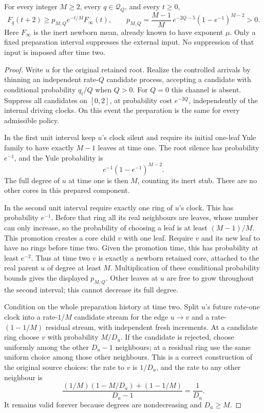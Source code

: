 \begin{lemma}
\label{bcl:preparation}
For every integer $M\ge2$, every $q\in\mathcal Q_Q$, and every $t\ge0$,
\begin{equation}\label{bcl:uniform-lower}
 \boxed{
 F_q(t+2)\ge p_{M,Q}e^{-t/M}F_\infty(t),\qquad
 p_{M,Q}=\frac{M-1}{M}\,e^{-2Q-5}
                         (1-e^{-1})^{M-2}>0.
 }
\end{equation}
Here $F_\infty$ is the inert newborn mean, already known to have
exponent $\mu$.  Only a fixed preparation interval suppresses the
external input.  No suppression of that input is imposed after time
two.
\end{lemma}
\begin{proof}
Write $u$ for the original retained root.  Realize the controlled
arrivals by thinning an independent rate-$Q$ candidate process,
accepting a candidate with conditional probability $q_t/Q$ when
$Q>0$.  For $Q=0$ this channel is absent.  Suppress all candidates
on $[0,2]$, at probability cost $e^{-2Q}$, independently of the
internal driving clocks.  On this event the preparation is the same
for every admissible policy.

In the first unit interval keep $u$'s clock silent and require its
initial one-leaf Yule family to have exactly $M-1$ leaves at time one.
The root silence has probability $e^{-1}$, and the Yule probability is
\[
 e^{-1}(1-e^{-1})^{M-2}.
\]
The full degree of $u$ at time one is then $M$, counting its inert
stub.  There are no other cores in this prepared component.

In the second unit interval require exactly one ring of $u$'s clock.
This has probability $e^{-1}$.  Before that ring all its real
neighbours are leaves, whose number can only increase, so the
probability of choosing a leaf is at least $(M-1)/M$.  This promotion
creates a core child $v$ with one leaf.  Require $v$ and its new leaf
to have no rings before time two.  Given the promotion time, this has
probability at least $e^{-2}$.  Thus at time two $v$ is exactly a
newborn retained core, attached to the real parent $u$ of degree at
least $M$.  Multiplication of these conditional probability bounds
gives the displayed $p_{M,Q}$.  Other leaves at $u$ are free to grow
throughout the second interval; this cannot decrease its full degree.

Condition on the whole preparation history at time two.  Split $u$'s
future rate-one clock into a rate-$1/M$ candidate stream for the edge
$u\to v$ and a rate-$(1-1/M)$ residual stream, with independent fresh
increments.  At a candidate ring choose $v$ with probability
$M/D_u$.  If the candidate is rejected, choose uniformly among the
other $D_u-1$ neighbours; at a residual ring use the same uniform
choice among those other neighbours.  This is a correct construction
of the original source choices: the rate to $v$ is $1/D_u$, and the
rate to any other neighbour is
\[
 \frac{(1/M)(1-M/D_u)+(1-1/M)}{D_u-1}
 =\frac1{D_u}.
\]
It remains valid forever because degrees are nondecreasing and
$D_u\ge M$.


\end{proof}
